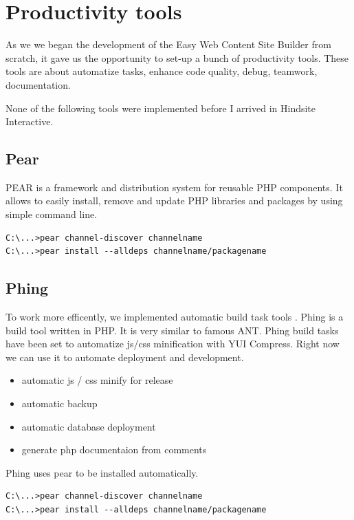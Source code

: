 \chapter{Productivity tools}
As we we began the development of the Easy Web Content Site Builder from scratch, it gave us the opportunity to set-up a bunch of productivity tools. These tools are about automatize tasks, enhance code quality, debug, teamwork, documentation.

None of the following tools were implemented before I arrived in Hindsite Interactive. 
\section{Pear}

PEAR is a framework and distribution system for reusable PHP components. It allows to easily install, remove and update PHP libraries and packages by using simple command line.
\\

\lstset{language=bash}
\begin{lstlisting}[label=pear-install,caption=Installation of pear packages]
C:\...>pear channel-discover channelname
C:\...>pear install --alldeps channelname/packagename
\end{lstlisting}

\section{Phing}

To work more efficently, we implemented automatic build task tools . Phing is a build tool written in PHP. It is very similar to famous ANT. Phing build tasks have been set to automatize js/css minification with YUI Compress.
Right now we can use it to automate deployment and development.
\begin{itemize}
\item automatic js / css minify for release
\item automatic backup
\item automatic database deployment
\item generate php documentaion from comments
\end{itemize}

Phing uses pear to be installed automatically.

\lstset{language=bash}
\begin{lstlisting}[label=phing-install,caption=Installation of Phing]
C:\...>pear channel-discover channelname
C:\...>pear install --alldeps channelname/packagename
\end{lstlisting}

